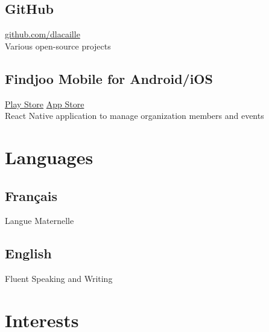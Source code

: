 \documentclass{article}
\begin{document}
\begin{paracol}{2}
\begin{leftcolumn}
    \subsection{GitHub}
    \href{https://github.com/dlacaille}{\faGithub\hspace{0.5em}github.com/dlacaille}\\
    Various open-source projects

    \vspace{0.5em}

    \subsection{Findjoo Mobile for Android/iOS}
    \href{https://play.google.com/store/apps/details?id=com.findjoomobile}{\faGooglePlay\hspace{0.5em}Play Store}\hspace{1em}
    \href{https://apps.apple.com/us/app/findjoo/id1499583717}{\faAppStore\hspace{0.5em}App Store}\\
    React Native application to manage organization members and events

    \section{Languages}

    \subsection{Français}
    Langue Maternelle

    \vspace{0.5em}

    \subsection{English}
    Fluent Speaking and Writing

    \section{Interests}


\end{leftcolumn}
\end{paracol}
\end{document}
